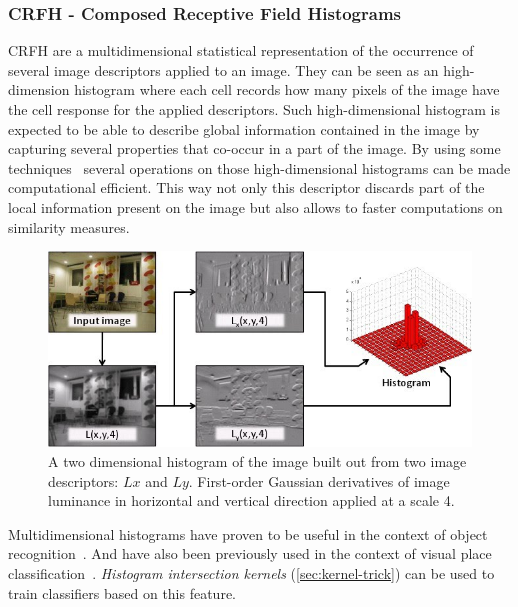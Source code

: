 \subsubsection*{{CRFH} - Composed Receptive Field Histograms}
\label{sec:crfh}\label{sec:global-features}
\gls{CRFH} are a multidimensional statistical
representation of the occurrence of several image descriptors applied to an
image. They can be seen as an high-dimension histogram where each cell records
how many pixels of the image have the cell response for the applied descriptors.
Such high-dimensional histogram is expected to be able to describe global
information contained in the image by capturing several properties that co-occur
in a part of the image.
By using some techniques~\cite{linde2004object} several operations on those
high-dimensional histograms can be made computational efficient. This way not
only this descriptor discards part of the local information present on the image
but also allows to faster computations on similarity measures.


\begin{figure}[h]
\begin{center}
\includegraphics[width=1\textwidth]{figures/crfh_model.jpg}
\end{center}
\caption{A two dimensional histogram of the image built out from two image
         descriptors: $Lx$ and $Ly$. First-order Gaussian derivatives of image
         luminance in horizontal and vertical direction applied at a scale 4.}
\end{figure}

Multidimensional histograms have proven to be useful in the context of object
recognition~\citep{schiele1996object}. And have also been previously used in
the context of visual place classification~\cite{pronobis2010ijrr}.
\emph{Histogram intersection kernels} (\autoref{sec:kernel-trick}) can be used
to train classifiers based on this feature.


